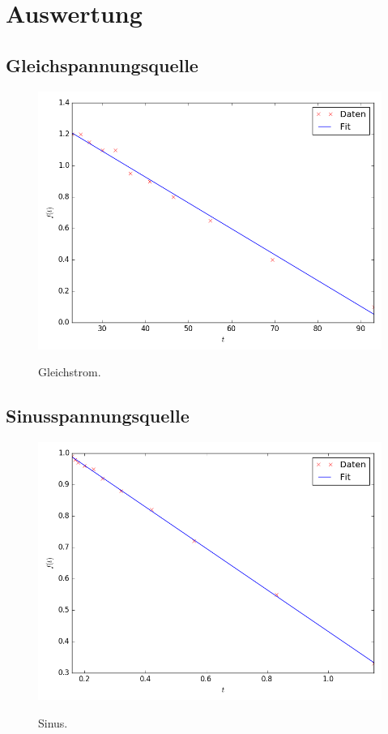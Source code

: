 \section{Auswertung}
\label{sec:Auswertung}

\subsection{Gleichspannungsquelle}
\begin{figure}[H]
	\centering
	\caption{Gleichstrom.}
	\includegraphics[width=\linewidth-150pt,height=\textheight-150pt,keepaspectratio]{Gleichstrom.png}
	\label{fig:Gleichstrom}
\end{figure}



\subsection{Sinusspannungsquelle}

\begin{figure}[H]
  \centering
  \caption{Sinus.}
  \includegraphics[width=\linewidth-150pt,height=\textheight-150pt,keepaspectratio]{Sinus.png}
  \label{fig:Sinus}
\end{figure}


